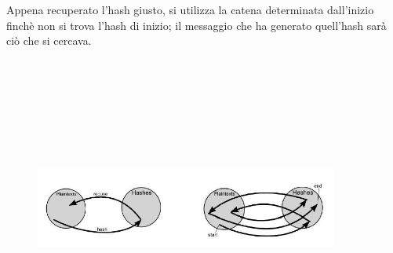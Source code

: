 Appena recuperato l'hash giusto, si utilizza la catena determinata dall'inizio finchè non si trova l'hash di inizio; il messaggio che ha generato quell'hash sarà ciò che si cercava.
\begin{figure}
	\begin{center}
	{\includegraphics[height=10cm, width=10cm, keepaspectratio]{Immagini/hash/riduzione.JPG}}
	\end{center}
\end{figure}